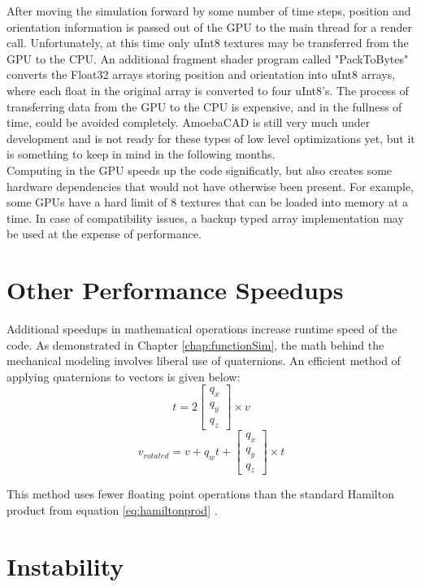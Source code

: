 {After moving the simulation forward by some number of time steps, position and orientation information is passed out of the GPU to the main thread for a render call.  Unfortunately, at this time only uInt8 textures may be transferred from the GPU to the CPU.  An additional fragment shader program called "PackToBytes" converts the Float32 arrays storing position and orientation into uInt8 arrays, where each float in the original array is converted to four uInt8's.  The process of transferring data from the GPU to the CPU is expensive, and in the fullness of time, could be avoided completely.  AmoebaCAD is still very much under development and is not ready for these types of low level optimizations yet, but it is something to keep in mind in the following months.\\

Computing in the GPU speeds up the code significatly, but also creates some hardware dependencies that would not have otherwise been present.  For example, some GPUs have a hard limit of 8 textures that can be loaded into memory at a time.  In case of compatibility issues, a backup typed array implementation may be used at the expense of performance.

\section{Other Performance Speedups}

Additional speedups in mathematical operations increase runtime speed of the code.  As demonstrated in Chapter \ref{chap:functionSim}, the math behind the mechanical modeling involves liberal use of quaternions.  An efficient method of applying quaternions to vectors is given below:
\[ t = 2 \left[ \begin{array}{ccc}
q_x\\
q_y\\
q_z
 \end{array} \right] \times v\]
\[ v_{rotated} = v + q_wt +  \left[ \begin{array}{ccc}
q_x\\
q_y\\
q_z
 \end{array} \right] \times t\]
 
 This method uses fewer floating point operations than the standard Hamilton product from equation \ref{eq:hamiltonprod} \cite{Reinalter}.

\section{Instability}

}
